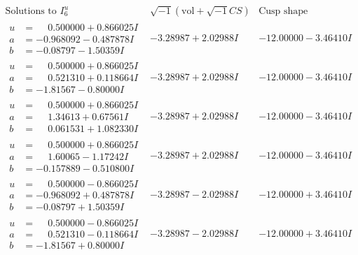 \documentclass[1p]{elsarticle_modified}
\theoremstyle{definition}
\newcommand{\I}{\sqrt{-1}}
\begin{document}
$$\begin{array}{c|c|c}  
\text{Solutions to }I^u_{6}& \I (\text{vol} + \sqrt{-1}CS) & \text{Cusp shape}\\
 \hline 
\begin{aligned}
u &= \phantom{-}0.500000 + 0.866025 I \\
a &= -0.968092 - 0.487878 I \\
b &= -0.08797 - 1.50359 I\end{aligned}
 & -3.28987 + 2.02988 I & -12.00000 - 3.46410 I \\ \hline\begin{aligned}
u &= \phantom{-}0.500000 + 0.866025 I \\
a &= \phantom{-}0.521310 + 0.118664 I \\
b &= -1.81567 - 0.80000 I\end{aligned}
 & -3.28987 + 2.02988 I & -12.00000 - 3.46410 I \\ \hline\begin{aligned}
u &= \phantom{-}0.500000 + 0.866025 I \\
a &= \phantom{-}1.34613 + 0.67561 I \\
b &= \phantom{-}0.061531 + 1.082330 I\end{aligned}
 & -3.28987 + 2.02988 I & -12.00000 - 3.46410 I \\ \hline\begin{aligned}
u &= \phantom{-}0.500000 + 0.866025 I \\
a &= \phantom{-}1.60065 - 1.17242 I \\
b &= -0.157889 - 0.510800 I\end{aligned}
 & -3.28987 + 2.02988 I & -12.00000 - 3.46410 I \\ \hline\begin{aligned}
u &= \phantom{-}0.500000 - 0.866025 I \\
a &= -0.968092 + 0.487878 I \\
b &= -0.08797 + 1.50359 I\end{aligned}
 & -3.28987 - 2.02988 I & -12.00000 + 3.46410 I \\ \hline\begin{aligned}
u &= \phantom{-}0.500000 - 0.866025 I \\
a &= \phantom{-}0.521310 - 0.118664 I \\
b &= -1.81567 + 0.80000 I\end{aligned}
 & -3.28987 - 2.02988 I & -12.00000 + 3.46410 I \\ \hline\begin{aligned}

\end{aligned}
\end{array}$$
\end{document}
